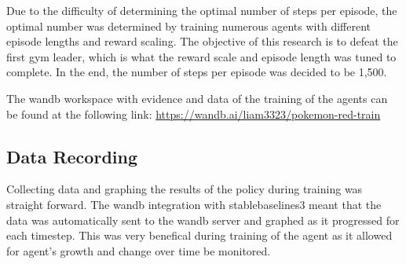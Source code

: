 Due to the difficulty of determining the optimal number of steps per episode, the optimal number was determined by training numerous agents with different episode lengths and reward scaling. The objective of this research is to defeat the first gym leader, which is what the reward scale and episode length was tuned to complete. In the end, the number of steps per episode was decided to be 1,500. 

The wandb workspace with evidence and data of the training of the agents can be found at the following link: \url{https://wandb.ai/liam3323/pokemon-red-train}

\subsection{Data Recording}

Collecting data and graphing the results of the policy during training was straight forward. The wandb integration with stablebaselines3 meant that the data was automatically sent to the wandb server and graphed as it progressed for each timestep. This was very benefical during training of the agent as it allowed for agent's growth and change over time be monitored.  
